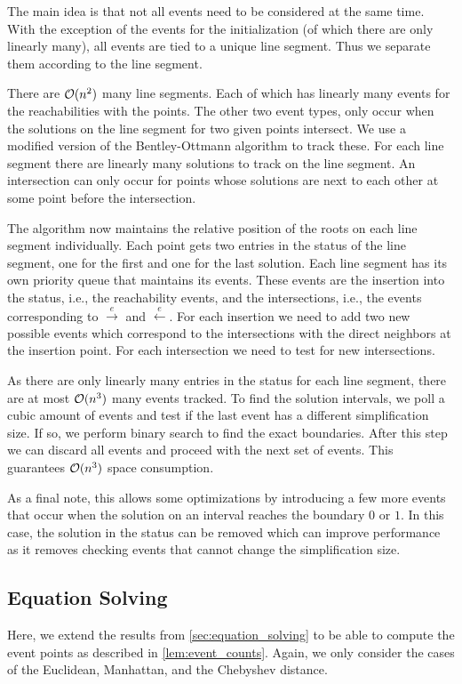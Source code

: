 The main idea is that not all events need to be considered at the same time. With the exception of the events for the initialization (of which there are only linearly many), all events are tied to a unique line segment. Thus we separate them according to the line segment. 

There are \(\mathcal{O}(n^2)\) many line segments. Each of which has linearly many events for the reachabilities with the points. The other two event types, only occur when the solutions on the line segment for two given points intersect. We use a modified version of the Bentley-Ottmann algorithm to track these. For each line segment there are linearly many solutions to track on the line segment. An intersection can only occur for points whose solutions are next to each other at some point before the intersection. 

The algorithm now maintains the relative position of the roots on each line segment individually. Each point gets two entries in the status of the line segment, one for the first and one for the last solution. Each line segment has its own priority queue that maintains its events. These events are the insertion into the status, i.e., the reachability events, and the intersections, i.e., the events corresponding to \(\overset e\rightarrow\) and \(\overset e\leftarrow\). For each insertion we need to add two new possible events which correspond to the intersections with the direct neighbors at the insertion point. For each intersection we need to test for new intersections.

As there are only linearly many entries in the status for each line segment, there are at most \(\mathcal{O}(n^3)\) many events tracked. To find the solution intervals, we poll a cubic amount of events and test if the last event has a different simplification size. If so, we perform binary search to find the exact boundaries. After this step we can discard all events and proceed with the next set of events. This guarantees \(\mathcal{O}(n^3)\) space consumption.

As a final note, this allows some optimizations by introducing a few more events that occur when the solution on an interval reaches the boundary \(0\) or \(1\). In this case, the solution in the status can be removed which can improve performance as it removes checking events that cannot change the simplification size. 

\subsection{Equation Solving}\label{ssec:equations-solving-2}
Here, we extend the results from \cref{sec:equation_solving} to be able to compute the event points as described in \cref{lem:event_counts}. Again, we only consider the cases of the Euclidean, Manhattan, and the Chebyshev distance. 

